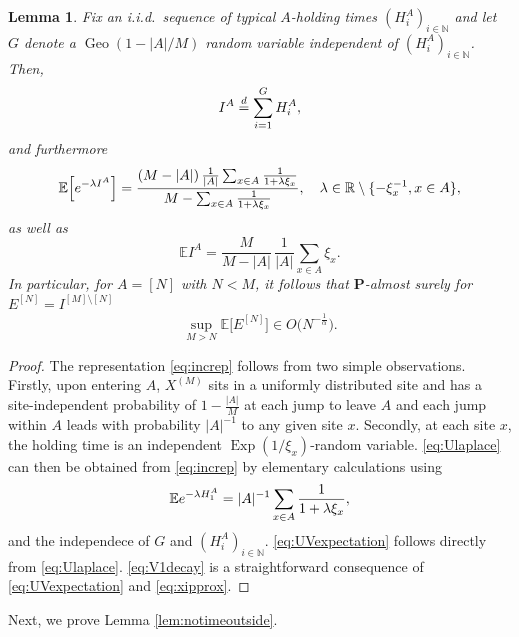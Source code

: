 \documentclass[11pt,a4paper]{scrartcl}
\numberwithin{equation}{section}
\theoremstyle{plain}
\newtheorem{lemma}[theorem]{Lemma}
\theoremstyle{definition}
\theoremstyle{remark}
\newcommand{\bE}{\ensuremath{\mathbb{E}}}
\newcommand{\bN}{\ensuremath{\mathbb{N}}}
\newcommand{\bR}{\ensuremath{\mathbb{R}}}
\newcommand{\bfP}{\mathbf{P}}
\begin{document}
\begin{lemma}
Fix an i.i.d.\ sequence of typical $A$-holding times $(H^A_i)_{i\in\bN}$ and let $G$ denote a $\operatorname{Geo}(1-|A|/M)$ random variable independent of $(H^A_i)_{i\in\bN}$. Then,
\begin{equation}\label{eq:increp}
I^A \overset{\textup{d}}{=} \sum_{i=1}^{G}H^{A}_i,
\end{equation}
and furthermore
\begin{equation}\label{eq:Ulaplace}
	\bE\Big[\textup{e}^{-\lambda I^A} \Big] = \frac{(M-|A|) \, \frac{1}{|A|}\sum_{x\in A} \frac{1}{1+\lambda \xi_x}}{ M-\sum_{x\in A}\frac{1 
		}{1+\lambda \xi_x}},\quad \lambda\in\bR\setminus\{-\xi_x^{-1}, x\in A\},
\end{equation}
as well as
\begin{equation}\label{eq:UVexpectation}
	\bE I^A = \frac{M}{M-|A|}\,\frac{1}{|A|} \sum_{x\in A}\xi_x.
\end{equation}
In particular, for $A=[N]$ with $N<M$, it follows
that $\bfP$-almost surely for $E^{[N]}=I^{[M]\setminus[N]}$
\begin{equation}\label{eq:V1decay}
	\sup_{M>N}\bE \big[E^{[N]}\big] \in O\big( N^{-\frac1\alpha} \big).
\end{equation}
\end{lemma}
\begin{proof}
The representation \eqref{eq:increp} follows from two simple observations. Firstly, upon entering $A$, $X^{(M)}$ sits in a uniformly distributed site and has a site-independent probability of $1-\frac{|A|}{M}$ at each jump to leave $A$ and each jump within $A$ leads with probability $|A|^{-1}$ to any given site $x$. Secondly, at each site $x$, the holding time is an independent $\operatorname{Exp}(1/\xi_x)$-random variable. \eqref{eq:Ulaplace} can then be obtained from \eqref{eq:increp} by elementary calculations using 
\begin{equation}\label{eq:moment}
\bE \textup{e}^{-\lambda H^A_1}=|A|^{-1}\sum_{x\in A}\frac{1}{1+\lambda\xi_x},
\end{equation}
 and the independece of $G$ and $(H^A_i)_{i\in\bN}$. \eqref{eq:UVexpectation} follows directly from \eqref{eq:Ulaplace}.  \eqref{eq:V1decay} is a straightforward consequence of \eqref{eq:UVexpectation} and \eqref{eq:xipprox}.
\end{proof}
Next, we prove Lemma \ref{lem:notimeoutside}.
\end{document}
